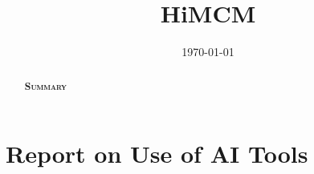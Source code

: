 \documentclass{mcmthesis}
\title{HiMCM}
\date{\today}
\begin{document}
\begin{abstract}

\begin{center}
{\large\scshape\bfseries Summary}
\end{center}

\end{abstract}

\maketitle
\newpage



{%
\tableofcontents
}

\setlength{\parskip}{0.05em}

\newpage




















% 

% 

% 







\newpage


\newpage


{\fontsize{10.5}{12.5}\selectfont

}

\clearpage
\setcounter{secnumdepth}{-1}
\section{Report on Use of AI Tools}
{\raggedright

\par}
\end{document}
